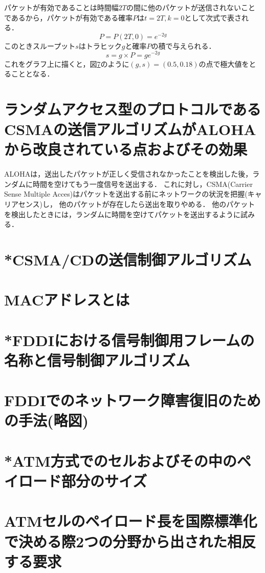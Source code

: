 \documentclass[10.5pt]{jsarticle}
\begin{document}
パケットが有効であることは時間幅$2T$の間に他のパケットが送信されないことであるから，パケットが有効である確率$P$は$t=2T, k=0$として次式で表される．
\[P = P(2T, 0) = e^{-2g}\]
このときスループット$s$はトラヒック$g$と確率$P$の積で与えられる．
\[s = g \times P = ge^{-2g}\]
これをグラフ上に描くと，図\ref{}のように$(g, s) = (0.5, 0.18)$の点で極大値をとることとなる．

\section{ランダムアクセス型のプロトコルであるCSMAの送信アルゴリズムがALOHAから改良されている点およびその効果}
ALOHAは，送出したパケットが正しく受信されなかったことを検出した後，ランダムに時間を空けてもう一度信号を送出する．
これに対し，CSMA(Carrier Sense Multiple Acces)はパケットを送出する前にネットワークの状況を把握(キャリアセンス)し，
他のパケットが存在したら送出を取りやめる．
他のパケットを検出したときには，ランダムに時間を空けてパケットを送出するように試みる．

\section{*CSMA/CDの送信制御アルゴリズム}



\section{MACアドレスとは}



\section{*FDDIにおける信号制御用フレームの名称と信号制御アルゴリズム}



\section{FDDIでのネットワーク障害復旧のための手法(略図)}



\section{*ATM方式でのセルおよびその中のペイロード部分のサイズ}



\section{ATMセルのペイロード長を国際標準化で決める際2つの分野から出された相反する要求}
\end{document}
